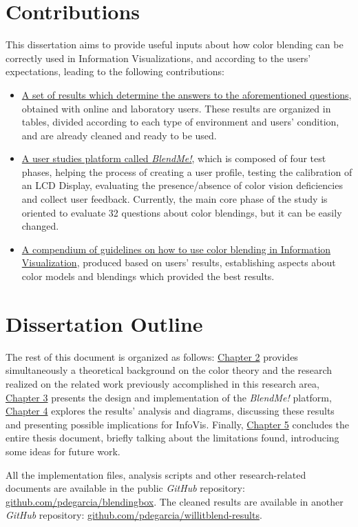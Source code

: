 \section{Contributions}
%
This dissertation aims to provide useful inputs about how color blending can be correctly used in Information Visualizations,
and according to the users' expectations, leading to the following contributions:
%
\begin{itemize}
  \item \ul{A set of results which determine the answers to the aforementioned questions}, obtained with online and laboratory
  users. These results are organized in tables, divided according to each type of environment and users' condition, and are
  already cleaned and ready to be used.
  \item \ul{A user studies platform called \emph{BlendMe!}}, which is composed of four test phases, helping the process of creating
  a user profile, testing the calibration of an LCD Display, evaluating the presence/absence of color vision deficiencies and collect
  user feedback. Currently, the main core phase of the study is oriented to evaluate 32 questions about color blendings, but it can
  be easily changed.
  \item \ul{A compendium of guidelines on how to use color blending in Information Visualization}, produced based on users'
  results, establishing aspects about color models and blendings which provided the best results.
\end{itemize}
%
\section{Dissertation Outline}
%
The rest of this document is organized as follows: \ul{Chapter 2} provides simultaneously a theoretical background on the
color theory and the research realized on the related work previously accomplished in this research area, \ul{Chapter 3}
presents the design and implementation of the \emph{BlendMe!} platform, \ul{Chapter 4} explores the results' analysis and
diagrams, discussing these results and presenting possible implications for InfoVis. Finally, \ul{Chapter 5} concludes the
entire thesis document, briefly talking about the limitations found, introducing some ideas for future work. \par
%
All the implementation files, analysis scripts and other research-related documents are available in the
public \emph{GitHub} repository: \url{github.com/pdegarcia/blendingbox}. The cleaned results are available in another \emph{GitHub} repository:
\url{github.com/pdegarcia/willitblend-results}.
%
